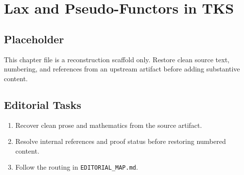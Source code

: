 \chapter{Lax and Pseudo-Functors in TKS}
\label{chap:lax-and-pseudo-functors-in-tks}

\section*{Placeholder}
This chapter file is a reconstruction scaffold only. Restore clean source text, numbering, and references from an upstream artifact before adding substantive content.

\section*{Editorial Tasks}
\begin{enumerate}
\item Recover clean prose and mathematics from the source artifact.
\item Resolve internal references and proof status before restoring numbered content.
\item Follow the routing in \texttt{EDITORIAL\_MAP.md}.
\end{enumerate}
